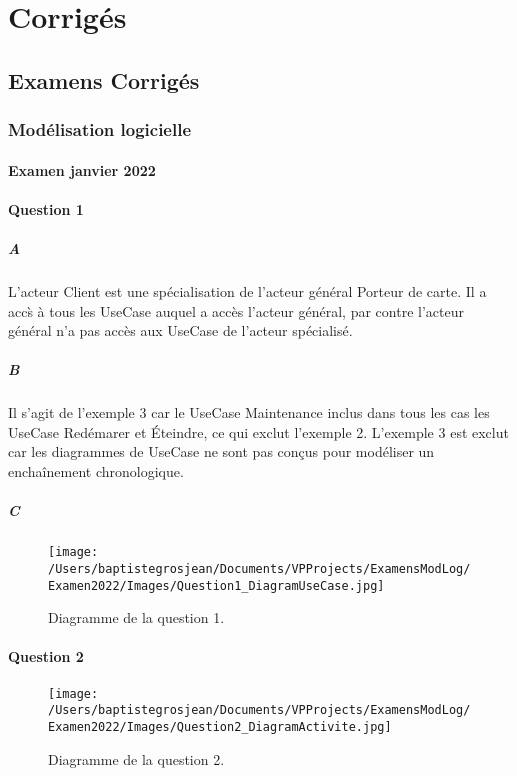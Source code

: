 \part{Corrig\'es}
\chapter{Examens Corrig\'es}\label{chap:examens}

\newpage
\section{Mod\'elisation logicielle}
\subsection{Examen janvier 2022}
\subsection*{Question 1}
\subsubsection*{A}
L'acteur Client est une sp\'ecialisation de l'acteur g\'en\'eral Porteur de carte. Il a acc\`s \`a tous les UseCase auquel a acc\`es l'acteur g\'en\'eral, par contre l'acteur g\'en\'eral n'a pas acc\`es aux UseCase de l'acteur sp\'ecialis\'e.
\subsubsection*{B}
Il s'agit de l'exemple 3 car le UseCase Maintenance inclus dans tous les cas les UseCase Red\'emarer et \'Eteindre, ce qui exclut l'exemple 2. L'exemple 3 est exclut car les diagrammes de UseCase ne sont pas conçus pour mod\'eliser un encha\^inement chronologique.
\subsubsection*{C}
\begin{figure}[H]
	\centering
	\texttt{[image: /Users/baptistegrosjean/Documents/VPProjects/ExamensModLog/Examen2022/Images/Question1\_DiagramUseCase.jpg]}
	\caption{Diagramme de la question 1.}
\end{figure}
\subsection*{Question 2}
\begin{figure}[H]
	\centering
	\texttt{[image: /Users/baptistegrosjean/Documents/VPProjects/ExamensModLog/Examen2022/Images/Question2\_DiagramActivite.jpg]}
	\caption{Diagramme de  la question 2.}
\end{figure}
